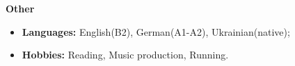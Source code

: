 {
    {\vspace{0.5cm} \hspace{-0.5cm} \Large \textbf{Other}}

    \begin{itemize}
        \item \textbf{Languages:} English(B2), German(A1-A2), Ukrainian(native);
        \item \textbf{Hobbies:} Reading, Music production, Running.
    \end{itemize}
}
